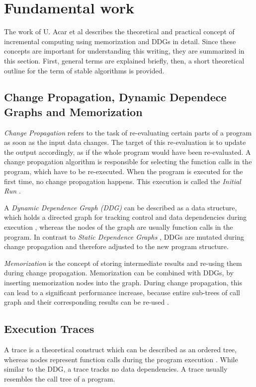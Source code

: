 \section{Fundamental work}
\label{sec:ddg_memo}
The work of U. Acar et al\cite{Acar2005thesis} describes the theoretical and practical concept of incremental computing using memorization and DDGs in detail. Since these concepts are important for understanding this writing, they are summarized in this section. First, general terms are explained briefly, then, a short theoretical outline for the term of stable algorithms is provided. 

\subsection{Change Propagation, Dynamic Dependece Graphs and Memorization}
\textit{Change Propagation} refers to the task of re-evaluating certain parts of a program as soon as the input data changes. The target of this re-evaluation is to update the output accordingly, as if the whole program would have been re-evaluated. A change propagation algorithm is responsible for selecting the function calls in the program, which have to be re-executed. When the program is executed for the first time, no change propagation happens. This execution is called the \textit{Initial Run} \cite{Acar2005thesis}.

A \textit{Dynamic Dependence Graph (DDG)} can be described as a data structure, which holds a directed graph for tracking control and data dependencies during execution \cite{Acar2005thesis}, whereas the nodes of the graph are usually function calls in the program. In contrast to \textit{Static Dependence Graphs} \cite{Demers1981}, DDGs are mutated during change propagation and therefore adjusted to the new program structure. 

\textit{Memorization} is the concept of storing intermediate results and re-using them during change propagation. Memorization can be combined with DDGs, by inserting memorization nodes into the graph. During change propagation, this can lead to a significant performance increase, because entire sub-trees of call graph and their corresponding results can be re-used \cite{Acar2005thesis}. 

\subsection{Execution Traces}
A trace is a theoretical construct which can be described as an ordered tree, whereas nodes represent function calls during the program execution \cite{Acar2005thesis}. While similar to the DDG, a trace tracks no data dependencies. A trace usually resembles the call tree of a program. 

